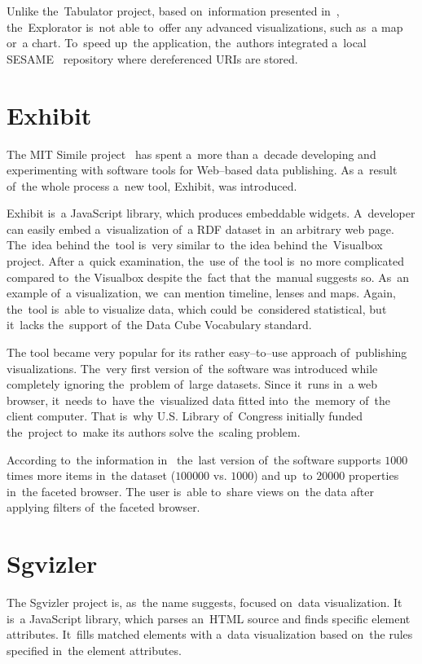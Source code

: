 Unlike the~Tabulator project, based on~information presented in~\cite{explorator},
the~Explorator is~not able to~offer any advanced visualizations, such as~a map or~a chart. To~speed up~the application, the~authors integrated a~local SESAME~\cite{sesame} 
repository where dereferenced URIs are stored.

\section{Exhibit}
The MIT Simile project~\cite{mit-simile} has spent a~more than a~decade
developing and experimenting with software tools for Web--based data publishing.
As a~result of~the whole process a~new tool, Exhibit, was introduced.

Exhibit is~a JavaScript library, which produces embeddable widgets. A~developer can
easily embed a~visualization of~a RDF dataset in~an arbitrary web page. The~idea behind 
the~tool is~very similar to~the idea behind the~Visualbox project. After a~quick 
examination, the~use of~the tool is~no more complicated compared to~the 
Visualbox despite the~fact that the~manual suggests so. As~an example of~a 
visualization, we~can mention timeline, lenses and maps. Again, the~tool is~able 
to visualize data, which could be~considered statistical, but it~lacks the~support of~the Data Cube Vocabulary standard.

The tool became very popular for its rather easy--to--use 
approach of~publishing visualizations. The~very first version of~the software
was introduced while completely ignoring the~problem of~large datasets.
Since it~runs in~a web browser, it~needs to~have the~visualized data
fitted into~the~memory of~the client 
computer. That is~why U.S. Library of~Congress initially funded the~project to~make its authors solve the~scaling problem.

According to~the information in~\cite{exhibit}
the~last version of~the software supports $1000$ times more items in~the
dataset ($100 000$ vs. $1000$) and up~to $20 000$ properties in~the faceted browser. 
The user is~able to~share views on~the data after applying filters of~the 
faceted browser. 

\section{Sgvizler}
The Sgvizler project is, as~the name suggests, focused on~data visualization. 
It is~a JavaScript library, which parses an~HTML source and finds specific 
element attributes. It~fills matched elements with a~data visualization based on~the rules specified in~the element attributes.

